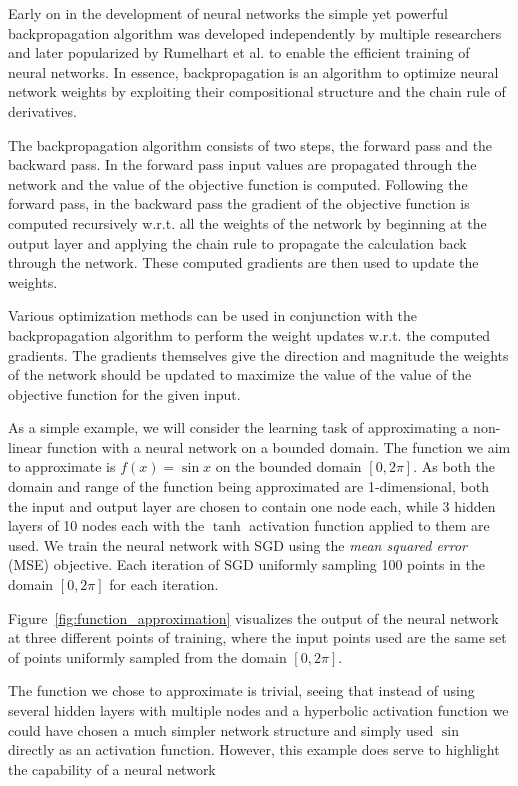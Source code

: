 Early on in the development of neural networks the simple yet powerful backpropagation algorithm was developed independently by multiple researchers and later popularized by Rumelhart et al. \cite{nature_backprop} to enable the efficient training of neural networks. In essence, backpropagation is an algorithm to optimize neural network weights by exploiting their compositional structure and the chain rule of derivatives.

The backpropagation algorithm consists of two steps, the forward pass and the backward pass. In the forward pass input values are propagated through the network and the value of the objective function is computed. Following the forward pass, in the backward pass the gradient of the objective function is computed recursively w.r.t. all the weights of the network by beginning at the output layer and applying the chain rule to propagate the calculation back through the network. These computed gradients are then used to update the weights.

Various optimization methods can be used in conjunction with the backpropagation algorithm to perform the weight updates w.r.t. the computed gradients. The gradients themselves give the direction and magnitude the weights of the network should be updated to maximize the value of the value of the objective function for the given input. 

As a simple example, we will consider the learning task of approximating a non-linear function with a neural network on a bounded domain. The function we aim to approximate is $f(x) = \sin x$ on the bounded domain $[0, 2\pi]$. As both the domain and range of the function being approximated are 1-dimensional, both the input and output layer are chosen to contain one node each, while 3 hidden layers of 10 nodes each with the $\tanh$ activation function applied to them are used. We train the neural network with SGD using the \textit{mean squared error} (MSE) objective. Each iteration of SGD uniformly sampling 100 points in the domain $[0, 2\pi]$ for each iteration.

Figure~\ref{fig:function_approximation} visualizes the output of the neural network at three different points of training, where the input points used are the same set of points uniformly sampled from the domain $[0, 2\pi]$. 

The function we chose to approximate is trivial, seeing that instead of using several hidden layers with multiple nodes and a hyperbolic activation function we could have chosen a much simpler network structure and simply used $\sin$ directly as an activation function. However, this example does serve to highlight the capability of a neural network 

